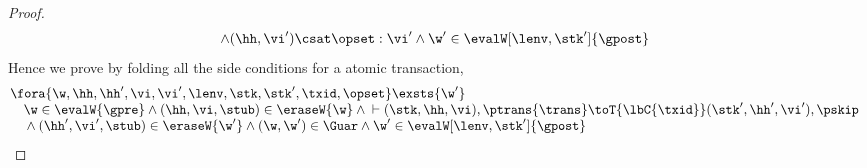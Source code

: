 \begin{proof}
\begin{equation}
\begin{array}{@{}l}
    \land (\hh, \vi') \csat \opset : \vi' 
    \land \w' \in \evalW[\lenv, \stk']{\gpost}
\end{array}
\end{equation}
Hence we prove  by folding all the side conditions for a atomic transaction,
\[
\begin{array}{@{}l}
    \fora{\w,  \hh, \hh', \vi, \vi', \lenv, \stk, \stk', \txid, \opset} \exsts{\w'} \\
    \quad \w \in \evalW{\gpre}
    \land (\hh, \vi, \stub) \in \eraseW{\w} 
    \land {} \vdash (\stk, \hh, \vi), \ptrans{\trans} \toT{\lbC{\txid}} (\stk', \hh', \vi'), \pskip  \\
    \quad {} \land (\hh',\vi', \stub) \in \eraseW{\w'}
    \land (\w, \w') \in \Guar 
    \land \w' \in \evalW[\lenv, \stk']{\gpost}
\end{array}
\]

\end{proof}
